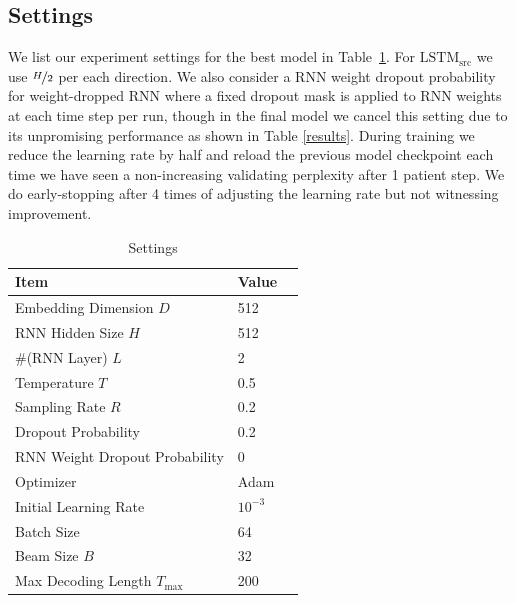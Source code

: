 \documentclass[11pt,a4paper]{article}
\begin{document}
\subsection{Settings}
We list our experiment settings for the best model in Table~\ref{settings}. For $\mathrm{LSTM}_\text{src}$ we use $\nicefrac{H}{2}$ per each direction. We also consider a RNN weight dropout probability for weight-dropped RNN \cite{merity2017regularizing} where a fixed dropout mask is applied to RNN weights at each time step per run, though in the final model we cancel this setting due to its unpromising performance as shown in Table \ref{results}. During training we reduce the learning rate by half and reload the previous model checkpoint each time we have seen a non-increasing validating perplexity after 1 patient step. We do early-stopping after 4 times of adjusting the learning rate but not witnessing improvement.
\begin{table}
\centering
\begin{tabular}{lll}
  \textbf{Item} & \textbf{Value} \\
  \hline
  Embedding Dimension $D$ & 512 \\
  RNN Hidden Size $H$ & 512 \\
  \#(RNN Layer) $L$  & 2 \\
  Temperature $T$ & 0.5 \\
  Sampling Rate $R$ & 0.2 \\
  Dropout Probability & 0.2 \\
  RNN Weight Dropout Probability & 0 \\
  Optimizer & Adam \\
  Initial Learning Rate & $10^{-3}$ \\
  Batch Size & 64 \\
  Beam Size $B$ & 32 \\
  Max Decoding Length $T_\text{max}$ & 200
\end{tabular}
\caption{Settings}
\label{settings}
\end{table}
\end{document}
